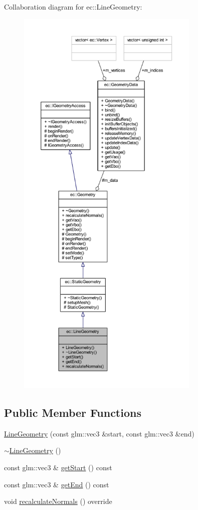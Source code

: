 Collaboration diagram for ec\+:\+:Line\+Geometry\+:\nopagebreak
\begin{figure}[H]
\begin{center}
\leavevmode
\includegraphics[height=550pt]{classec_1_1_line_geometry__coll__graph}
\end{center}
\end{figure}
\subsection*{Public Member Functions}
\begin{DoxyCompactItemize}
\item 
\mbox{\hyperlink{classec_1_1_line_geometry_a4b81b2c570058683d7af913882ed3dfb}{Line\+Geometry}} (const glm\+::vec3 \&start, const glm\+::vec3 \&end)
\item 
\mbox{\hyperlink{classec_1_1_line_geometry_af91430db7913243304adba2dd398e5b4}{$\sim$\+Line\+Geometry}} ()
\item 
const glm\+::vec3 \& \mbox{\hyperlink{classec_1_1_line_geometry_a68975a8bddebc31db08839ec6064a864}{get\+Start}} () const
\item 
const glm\+::vec3 \& \mbox{\hyperlink{classec_1_1_line_geometry_a3f4616c581e43529651008c594c4c8f7}{get\+End}} () const
\item 
void \mbox{\hyperlink{classec_1_1_line_geometry_a7a0b22930aa566c97d5f86f2a8246696}{recalculate\+Normals}} () override
\end{DoxyCompactItemize}
